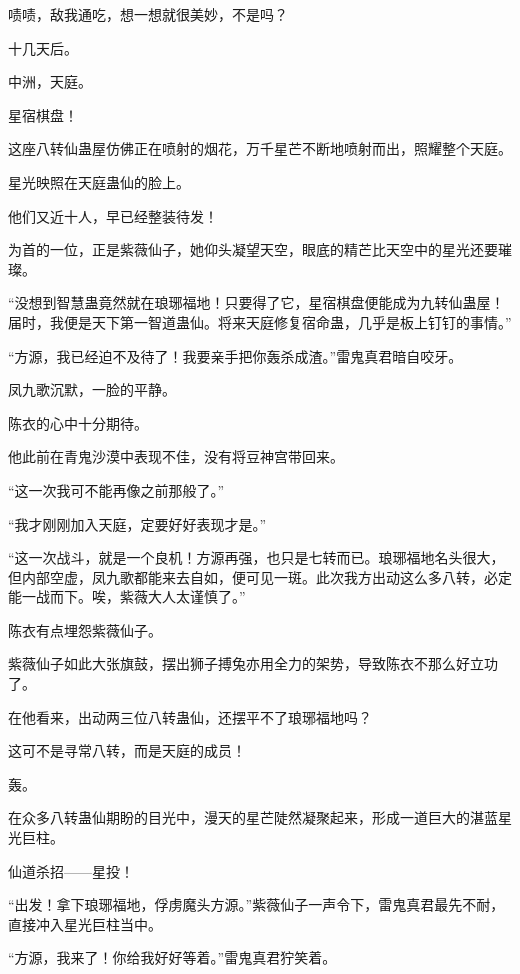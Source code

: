 \begin{this_body}
啧啧，敌我通吃，想一想就很美妙，不是吗？

十几天后。

中洲，天庭。

星宿棋盘！

这座八转仙蛊屋仿佛正在喷射的烟花，万千星芒不断地喷射而出，照耀整个天庭。

星光映照在天庭蛊仙的脸上。

他们又近十人，早已经整装待发！

为首的一位，正是紫薇仙子，她仰头凝望天空，眼底的精芒比天空中的星光还要璀璨。

“没想到智慧蛊竟然就在琅琊福地！只要得了它，星宿棋盘便能成为九转仙蛊屋！届时，我便是天下第一智道蛊仙。将来天庭修复宿命蛊，几乎是板上钉钉的事情。”

“方源，我已经迫不及待了！我要亲手把你轰杀成渣。”雷鬼真君暗自咬牙。

凤九歌沉默，一脸的平静。

陈衣的心中十分期待。

他此前在青鬼沙漠中表现不佳，没有将豆神宫带回来。

“这一次我可不能再像之前那般了。”

“我才刚刚加入天庭，定要好好表现才是。”

“这一次战斗，就是一个良机！方源再强，也只是七转而已。琅琊福地名头很大，但内部空虚，凤九歌都能来去自如，便可见一斑。此次我方出动这么多八转，必定能一战而下。唉，紫薇大人太谨慎了。”

陈衣有点埋怨紫薇仙子。

紫薇仙子如此大张旗鼓，摆出狮子搏兔亦用全力的架势，导致陈衣不那么好立功了。

在他看来，出动两三位八转蛊仙，还摆平不了琅琊福地吗？

这可不是寻常八转，而是天庭的成员！

轰。

在众多八转蛊仙期盼的目光中，漫天的星芒陡然凝聚起来，形成一道巨大的湛蓝星光巨柱。

仙道杀招——星投！

“出发！拿下琅琊福地，俘虏魔头方源。”紫薇仙子一声令下，雷鬼真君最先不耐，直接冲入星光巨柱当中。

“方源，我来了！你给我好好等着。”雷鬼真君狞笑着。

\end{this_body}

